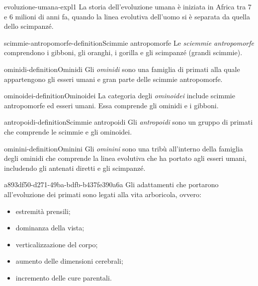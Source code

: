 \documentclass[preview]{standalone}
\begin{document}
\begin{snippet}{evoluzione-umana-expl1}
    La storia dell'evoluzione umana è iniziata in Africa tra
    7 e 6 milioni di anni fa, quando la linea evolutiva dell'uomo
    si è separata da quella dello scimpanzé. 
\end{snippet}

\begin{snippetdefinition}{scimmie-antropomorfe-definition}{Scimmie antropomorfe}
    Le \textit{sciemmie antropomorfe} comprendono i gibboni, gli oranghi, i gorilla
    e gli scimpanzé (grandi scimmie).
\end{snippetdefinition}

\begin{snippetdefinition}{ominidi-definition}{Ominidi}
    Gli \textit{ominidi} sono una famiglia di primati
    alla quale appartengono gli esseri umani
    e gran parte delle scimmie antropomorfe. %
\end{snippetdefinition}

\begin{snippetdefinition}{ominoidei-definition}{Ominoidei}
    La categoria degli \textit{ominoidei} include scimmie antropomorfe ed esseri umani.
    Essa comprende gli ominidi e i gibboni.
\end{snippetdefinition}

\begin{snippetdefinition}{antropoidi-definition}{Scimmie antropoidi}
    Gli \textit{antropoidi} sono un gruppo di primati che comprende le
    scimmie e gli ominoidei. 
\end{snippetdefinition}

\begin{snippetdefinition}{ominini-definition}{Ominini}
    Gli \textit{ominini} sono una tribù all'interno della famiglia degli ominidi
    che comprende la linea evolutiva che ha portato agli esseri umani,
    includendo gli antenati diretti e gli scimpanzé.
\end{snippetdefinition}


\begin{snippet}{a893df50-d271-49ba-bdfb-b437fe390a6a}
    Gli adattamenti che portarono all'evoluzione dei primati sono legati alla
    vita arboricola, ovvero:
    \begin{itemize}
        \item estremità prensili;
        \item dominanza della vista;
        \item verticalizzazione del corpo;
        \item aumento delle dimensioni cerebrali;
        \item incremento delle cure parentali.
    \end{itemize}
\end{snippet}
\end{document}
